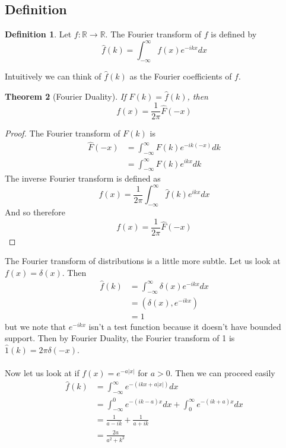 \documentclass{article}
\newcommand{\R}{\mathbb{R}}
\newtheorem{theorem}{Theorem}[section]
\theoremstyle{definition}
\newtheorem{definition}[theorem]{Definition}
\begin{document}
\subsection{Definition}
\begin{definition}
    Let $f:\R \to \R$. The Fourier transform of $f$ is defined by
    \begin{equation*}
        \hat f (k) = \int^\infty_{-\infty}f(x)e^{-ikx}dx
    \end{equation*}
\end{definition}
Intuitively we can think of $\hat f(k)$ as the Fourier coefficients of $f$.
\begin{theorem}[Fourier Duality]
    If $F(k) = \hat f (k)$, then 
    \begin{equation*}
        f(x) =\frac{1}{2\pi}\hat F(-x)
    \end{equation*}
\end{theorem}
\begin{proof}
    The Fourier transform of $F(k)$ is 
    \begin{equation*}
        \begin{split}
            \hat F(-x)  &=\int^\infty_{-\infty} F(k) e^{-ik(-x)}dk \\
            &= \int^\infty_{-\infty} F(k) e^{ikx}dk
        \end{split}
    \end{equation*}
    The inverse Fourier transform is defined as 
    \begin{equation*}
        f(x) = \frac{1}{2\pi } \int^\infty_{-\infty} \hat f (k) e^{ikx}dx
    \end{equation*}
    And so therefore 
    \begin{equation*}
        f(x) = \frac{1}{2\pi}\hat F(-x)
    \end{equation*}
\end{proof}
The Fourier transform of distributions is a little more subtle. Let us look at $f(x) =\delta (x)$. Then
\begin{equation*}
    \begin{split}
        \hat f(k) &= \int^\infty_{-\infty} \delta (x) e^{-ikx} dx \\
        &= (\delta (x),e^{-ikx}) \\
        &=1
    \end{split}
\end{equation*}
but we note that $e^{-ikx}$ isn't a test function because it doesn't have bounded support. Then by Fourier Duality, the Fourier transform of 1 is $\hat 1(k) =2\pi \delta (-x)$.\\\\
Now let us look at if $f(x) =e^{-a |x|}$ for $a>0$. Then we can proceed easily 
\begin{equation*}
    \begin{split}
        \hat f(k) &= \int^\infty_{-\infty} e^{-(ikx+a|x|)}dx \\
        &= \int^0_{-\infty} e^{-(ik-a)x}dx + \int_0^\infty e^{-(ik+a)x}dx \\
        &= \frac{1}{a-ik}+\frac{1}{a+ik} \\
        &= \frac{2a}{a^2+k^2}
    \end{split}
\end{equation*}
\end{document}
